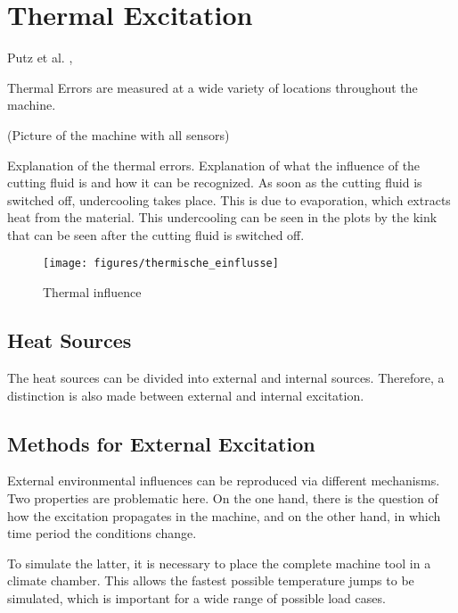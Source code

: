 \chapter{Thermal Excitation}
\label{chp:thermal_excitation}

Putz et al. \cite{Putz2018}, \cite{Putz2018a}

Thermal Errors are measured at a wide variety of locations throughout the machine. 

(Picture of the machine with all sensors)

Explanation of the thermal errors. Explanation of what the influence of the cutting fluid is and how it can be recognized. As soon as the cutting fluid is switched off, undercooling takes place. This is due to evaporation, which extracts heat from the material. This undercooling can be seen in the plots by the kink that can be seen after the cutting fluid is switched off.

\begin{figure}[!htb]
    \centering
    \texttt{[image: figures/thermische\_einflusse]} %
    \caption[2D Example Least Square vs. Gruop LASSO]{Thermal influence}
    \label{fig:thermische Einflusse}
\end{figure}




\section{Heat Sources}
\label{sec:heat_sources}

The heat sources can be divided into external and internal sources. Therefore, a distinction is also made between external and internal excitation.


\section{Methods for External Excitation}
\label{sec:External_Excitation}

External environmental influences can be reproduced via different mechanisms. Two properties are problematic here. On the one hand, there is the question of how the excitation propagates in the machine, and on the other hand, in which time period the conditions change.

To simulate the latter, it is necessary to place the complete machine tool in a climate chamber. This allows the fastest possible temperature jumps to be simulated, which is important for a wide range of possible load cases.

